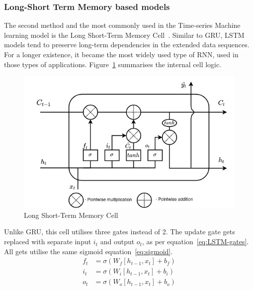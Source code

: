\subsubsection{Long-Short Term Memory based models} \label{subsub:lstm}
The second method and the most commonly used in the Time-series Machine learning model is the Long Short-Term Memory Cell~\cite{LSTM_Hochreiter1997}.
Similar to GRU, LSTM models tend to preserve long-term dependencies in the extended data sequences.
For a longer existence, it became the most widely used type of RNN, used in those types of applications.
Figure~\ref{fig:LSTM-cell} summarises the internal cell logic.
\begin{figure}[ht]%
    \centering
    \includegraphics[width=0.7\linewidth]{II_Body/LSTM/images/LSTM.jpg}
    \caption{Long Short-Term Memory Cell}
    \label{fig:LSTM-cell}
\end{figure}
Unlike GRU, this cell utilises three gates instead of 2.
The update gate gets replaced with separate input $i_t$ and output $o_t$, as per equation~\ref{eq:LSTM-gates}.
All gets utilise the same sigmoid equation~\ref{eq:sigmoid}.
\begin{equation}
    \begin{split}
        f_t &= \sigma \left(W_f \left[h_{t-1}, x_t \right] + b_f \right) \\
        i_t &= \sigma \left(W_i \left[h_{t-1}, x_t \right] + b_i \right) \\
        o_t &= \sigma \left(W_o \left[h_{t-1}, x_t \right] + b_o \right) \\    
    \end{split}
    \label{eq:LSTM-gates}
\end{equation}
